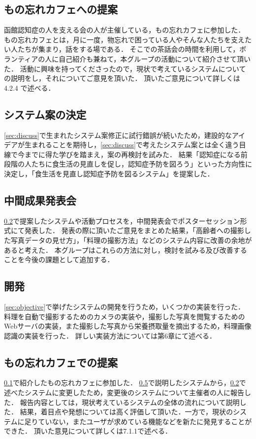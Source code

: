 \documentclass[../report]{subfiles}
\begin{document}
\subsection{もの忘れカフェへの提案} \label{sec:propose_cafe}
函館認知症の人を支える会の人が主催している，もの忘れカフェに参加した．
もの忘れカフェとは，月に一度，物忘れで困っている人やそんな人たちを支えたい人たちが集まり，話をする場である．
そこでの茶話会の時間を利用して，ボランティアの人に自己紹介も兼ねて，本グループの活動について紹介させて頂いた．
活動に興味を持ってくださったので，現状で考えているシステムについての説明をし，それについてご意見を頂いた．
頂いたご意見について詳しくは4.2.4 で述べる．

\subsection{システム案の決定} \label{sec:decision}
\ref{sec:discuss}で生まれたシステム案修正に試行錯誤が続いたため，建設的なアイデアが生まれることを期待し，\ref{sec:discuss}で考えたシステム案とは全く違う目線で今までに得た学びを踏まえ，案の再検討を試みた．
結果「認知症になる前段階の人たちに食生活の見直しを促し，認知症予防を図ろう」といった方向性に決定し，「食生活を見直し認知症予防を図るシステム」を提案した．

\subsection{中間成果発表会}
\ref{sec:decision}で提案したシステムや活動プロセスを，中間発表会でポスターセッション形式にて発表した．
発表の際に頂いたご意見をまとめた結果，「高齢者への撮影した写真データの見せ方」，「料理の撮影方法」などのシステム内容に改善の余地があると考えた．
本グループはこれらの方法に対し，検討を試みる及び改善することを今後の課題として追加する．

\subsection{開発}
\ref{sec:objective}で挙げたシステムの開発を行うため，いくつかの実装を行った．
料理を自動で撮影するためのカメラの実装や，撮影した写真を閲覧するためのWebサーバの実装，また撮影した写真から栄養摂取量を摘出するため，料理画像認識の実装を行った．
詳しい実装方法については第6章にて述べる．

\subsection{もの忘れカフェでの提案} \label{sec:propose_cafe2}
\ref{sec:propose_cafe}で紹介したもの忘れカフェに参加した．
\ref{sec:propose_cafe2}で説明したシステムから，\ref{sec:decision}で述べたシステムに変更したため，変更後のシステムについて主催者の人に報告した．
報告内容としては，現状考えているシステムの全体の流れについて説明した．
結果，着目点や発想については高く評価して頂いた．一方で，現状のシステムに足りていない，またユーザが求めている機能などを新たに発見することができた．
頂いた意見について詳しくは7.1.1で述べる．
\end{document}
